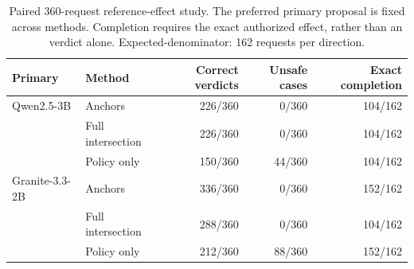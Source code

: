 \begin{table}[htbp]
\centering\footnotesize\setlength{\tabcolsep}{3pt}
\caption{Paired 360-request reference-effect study. The preferred primary proposal is fixed across methods. Completion requires the exact authorized effect, rather than an \allow verdict alone. Expected-\allow denominator: 162 requests per direction.}
\label{tab:paired}
\begin{tabular}{llrrr}
\toprule
Primary & Method & Correct verdicts & Unsafe cases & Exact completion \\
\midrule
Qwen2.5-3B & Anchors & 226/360 & 0/360 & 104/162 \\
 & Full intersection & 226/360 & 0/360 & 104/162 \\
 & Policy only & 150/360 & 44/360 & 104/162 \\
Granite-3.3-2B & Anchors & 336/360 & 0/360 & 152/162 \\
 & Full intersection & 288/360 & 0/360 & 104/162 \\
 & Policy only & 212/360 & 88/360 & 152/162 \\
\bottomrule
\end{tabular}
\end{table}
